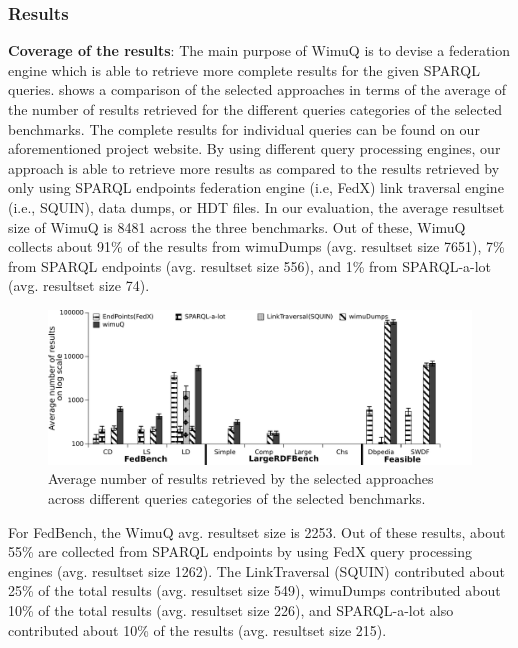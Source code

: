 \documentclass[sw]{iosart2x}
\begin{document}
\subsubsection{Results}
\textbf{Coverage of the results}: The main purpose of WimuQ is to devise a federation engine which is able to retrieve more complete results for the given SPARQL queries. %
 shows a comparison of the selected approaches in terms of the average of the number of results retrieved for the different queries categories of the selected benchmarks. The complete results for individual queries can be found on our aforementioned project website. By using different query processing engines, our approach is able to retrieve more results as compared to the results retrieved by only using SPARQL endpoints federation engine (i.e, FedX) link traversal engine (i.e., SQUIN), data dumps, or  HDT files. In our evaluation, the average resultset size of WimuQ is 8481 across the three benchmarks. Out of these, WimuQ collects about 91\% of the results from wimuDumps (avg. resultset size 7651), 7\% from SPARQL endpoints (avg. resultset size 556), and 1\% from SPARQL-a-lot (avg. resultset size 74). 

\begin{figure}[htb]
    \includegraphics[width=\textwidth]{img/numberRes1.pdf}
	\caption{Average number of results retrieved by the selected approaches across different queries categories of the selected benchmarks.}
	\label{fig:numberRes1}
\end{figure}

For FedBench, the WimuQ avg. resultset size is \num{2253}. Out of these results, about 55\% are collected from SPARQL endpoints by using FedX query processing engines (avg. resultset size \num{1262}). The LinkTraversal (SQUIN) contributed about 25\% of the total results (avg. resultset size 549), wimuDumps contributed about 10\% of the total results (avg. resultset size 226), and SPARQL-a-lot also contributed about 10\% of the results (avg. resultset size 215). 
\end{document}
